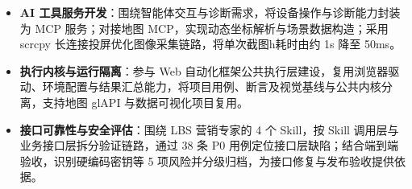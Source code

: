 \documentclass[10pt]{article}
\begin{document}
    \begin{itemize}
        \item \textbf{AI 工具服务开发}：围绕智能体交互与诊断需求，将设备操作与诊断能力封装为 MCP 服务；对接地图 MCP，实现动态坐标解析与场景数据构造；采用 scrcpy 长连接投屏优化图像采集链路，将单次截图h耗时由约 1s 降至 50ms。
        \item \textbf{执行内核与运行隔离}：参与 Web 自动化框架公共执行层建设，复用浏览器驱动、环境配置与结果汇总能力，将项目用例、断言及视觉基线与公共内核分离，支持地图 glAPI 与数据可视化项目复用。
        \item \textbf{接口可靠性与安全评估}：围绕 LBS 营销专家的 4 个 Skill，按 Skill 调用层与业务接口层拆分验证链路，通过 38 条 P0 用例定位接口层缺陷；结合端到端验收，识别硬编码密钥等 5 项风险并分级归档，为接口修复与发布验收提供依据。
    \end{itemize}


\end{document}
